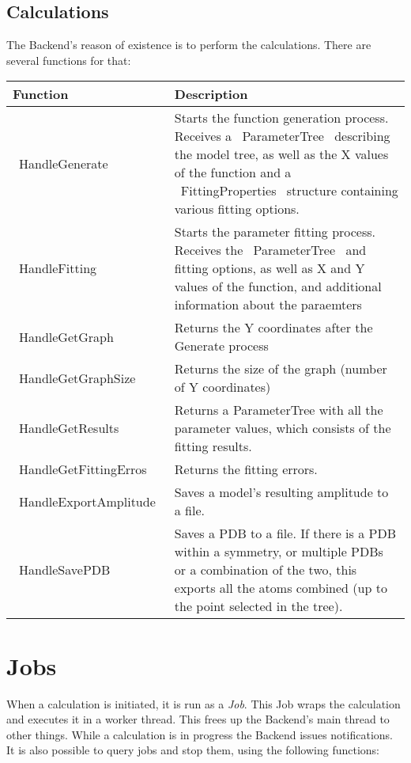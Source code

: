 \documentclass[12pt]{article}
\begin{document}
\subsection{Calculations}
The Backend's reason of existence is to perform the calculations. There are several functions for that:
\begin{center}
	\begin{tabular}{|l|p{7cm}|}
		\hline
		\textbf{Function} & \textbf{Description} \\ \hline
		~HandleGenerate~ & Starts the function generation process. Receives a ~ParameterTree~ describing the model tree, as well as the X values of the function and a ~FittingProperties~ structure containing various fitting options. \\ \hline
		~HandleFitting~ & Starts the parameter fitting process. Receives the ~ParameterTree~ and fitting options, as well as X and Y values of the function, and additional information about the paraemters \\ \hline
		~HandleGetGraph~ & Returns the Y coordinates after the Generate process \\ \hline
		~HandleGetGraphSize~ & Returns the size of the graph (number of Y coordinates) \\ \hline
		~HandleGetResults~ & Returns a ParameterTree with all the parameter values, which consists of the fitting results. \\ \hline
		~HandleGetFittingErros~ & Returns the fitting errors. \\ \hline
		~HandleExportAmplitude~ & Saves a model's resulting amplitude to a file. \\ \hline
		~HandleSavePDB~ & Saves a PDB to a file. If there is a PDB within a symmetry, or multiple PDBs or a combination of the two, this exports all the atoms combined (up to the point selected in the tree). \\ \hline
	\end{tabular}
\end{center}

\section{Jobs}
When a calculation is initiated, it is run as a \emph{Job}. This Job wraps the calculation and executes it in a worker thread. This frees up the Backend's main thread to other things. While a calculation is in progress the Backend issues notifications. It is also possible to query jobs and stop them, using the following functions:
\end{document}
